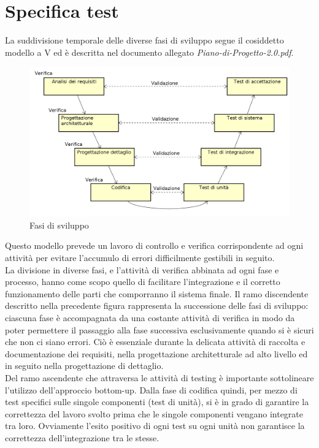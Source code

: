 \documentclass[a4paper,11pt]{article}
\begin{document}
\newpage
\section{Specifica test}
\label{Appendice B} 
La suddivisione temporale delle diverse fasi di sviluppo segue il cosiddetto modello a V ed è descritta nel documento allegato \textit{Piano-di-Progetto-2.0.pdf}.
\begin{figure}[h!]
\centering
\includegraphics[scale=0.4]{../images/vmodel-final4.png}
\caption{Fasi di sviluppo}
\end{figure} 
Questo modello prevede un lavoro di controllo e verifica corrispondente ad ogni attività per evitare l'accumulo di errori difficilmente gestibili in seguito.\\
La divisione in diverse fasi, e l'attività di verifica abbinata ad ogni fase e processo, hanno come scopo quello di facilitare l'integrazione e il corretto funzionamento delle parti che comporranno il sistema finale.
Il ramo discendente descritto nella precedente figura rappresenta la successione delle fasi di sviluppo: ciascuna fase è accompagnata da una costante attività di verifica in modo da poter permettere il passaggio alla fase successiva esclusivamente quando si è sicuri che non ci siano errori. Ciò è essenziale durante la delicata attività di raccolta e documentazione dei requisiti, nella progettazione architetturale ad alto livello ed in seguito nella progettazione di dettaglio.\\ 
Del ramo ascendente che attraversa le attività di testing è importante sottolineare l'utilizzo dell'approccio bottom-up.
Dalla fase di codifica quindi, per mezzo di test specifici sulle singole componenti (test di unità), si è in grado di garantire la correttezza del lavoro svolto prima che le singole componenti vengano integrate tra loro. Ovviamente l'esito positivo di ogni test su ogni unità non garantisce la correttezza dell'integrazione tra le stesse. \\
\end{document}

